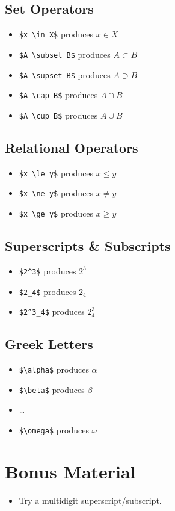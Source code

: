 \documentclass{article}
\begin{document}
\subsection{Set Operators}
\begin{itemize}
	\item \texttt{\$x \textbackslash{}in X\$} produces $x \in X$
	\item \texttt{\$A \textbackslash{}subset B\$} produces $A \subset B$
	\item \texttt{\$A \textbackslash{}supset B\$} produces $A \supset B$
	\item \texttt{\$A \textbackslash{}cap B\$} produces $A \cap B$
	\item \texttt{\$A \textbackslash{}cup B\$} produces $A \cup B$
\end{itemize}

\subsection{Relational Operators}
\begin{itemize}
	\item \texttt{\$x \textbackslash{}le y\$} produces $x \le y$
	\item \texttt{\$x \textbackslash{}ne y\$} produces $x \ne y$
	\item \texttt{\$x \textbackslash{}ge y\$} produces $x \ge y$
\end{itemize}

\subsection{Superscripts \& Subscripts}
\begin{itemize}
	\item \texttt{\$2\^{}3\$} produces $2^3$
	\item \texttt{\$2\_{}4\$} produces $2_4$
	\item \texttt{\$2\^{}3\_{}4\$} produces $2^3_4$
\end{itemize}

\subsection{Greek Letters}
\begin{itemize}
	\item \texttt{\$\textbackslash{}alpha\$} produces $\alpha$
	\item \texttt{\$\textbackslash{}beta\$} produces $\beta$
	\item \dots
	\item \texttt{\$\textbackslash{}omega\$} produces $\omega$
\end{itemize}

\section*{Bonus Material}
\begin{itemize}
	\item Try a multidigit superscript/subscript.
\end{itemize}
\end{document}
